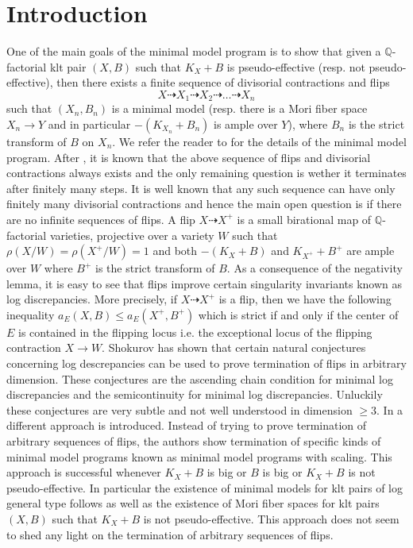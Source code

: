 \documentclass{amsart}
\renewcommand{\qq}{\mathbb{Q}}
\theoremstyle{remark}
\numberwithin{equation}{section}
\begin{document}
\section*{Introduction}
One of the main goals of the minimal model program is to show that given a $\qq$-factorial klt pair $(X,B)$ such that $K_X+B$ is pseudo-effective (resp. not pseudo-effective), then there exists a finite sequence of divisorial contractions and flips $$X\dasharrow X_1\dasharrow X_2\dasharrow \ldots \dasharrow X_n$$ such that $(X_n,B_n)$ is a minimal model (resp. there is a Mori fiber space $X_n\to Y$ and in particular $-(K_{X_n}+B_n)$ is ample over $Y$), where $B_n$ is the strict transform of $B$ on $X_n$. We refer the reader to \cite{KM98} for the details of the minimal model program.
After \cite{BCHM}, it is known that the above sequence of flips and divisorial contractions always exists and the only remaining question is wether it terminates after finitely many steps. It is well known that any such sequence can have only finitely many divisorial contractions and hence the main open question is if there are no infinite sequences of flips.
A flip $X\dasharrow X^+$ is a small birational map of $\qq$-factorial varieties, projective over a variety $W$ such that $\rho(X/W)=\rho (X^+/W)=1$ and both $-(K_X+B)$ and $K_{X^+}+B^+$  are ample over $W$ where $B^+$ is the strict transform of $B$.
As a consequence of the negativity lemma, it is easy to see that flips improve certain singularity invariants known as log discrepancies. More precisely, if $X\dasharrow X^+$ is a flip, then we have the following inequality $a_E(X,B)\leq a_E(X^+,B^+)$ which is strict if and only if the center of $E$ is contained in the flipping locus i.e. the exceptional locus of the flipping contraction $X\to W$.
Shokurov has shown \cite{Shok04} that certain natural conjectures concerning log descrepancies can be used to prove
termination of flips in arbitrary dimension.
These conjectures are the ascending chain condition for minimal log discrepancies and the semicontinuity for minimal log discrepancies.
Unluckily these conjectures are very subtle and not well understood in dimension $\geq 3$.
In \cite{BCHM} a different approach is introduced. Instead of trying to prove termination of arbitrary sequences of flips, the authors show termination of specific kinds of minimal model programs known as minimal model programs with scaling. This approach is successful whenever $K_X+B$ is big or $B$ is big or $K_X+B$ is not pseudo-effective. In particular the existence of minimal models for klt pairs of log general type follows as well as the existence of Mori fiber spaces for klt pairs $(X,B)$ such that $K_X+B$ is not pseudo-effective.
This approach does not seem to shed any light on the termination of arbitrary sequences of flips.
\end{document}
